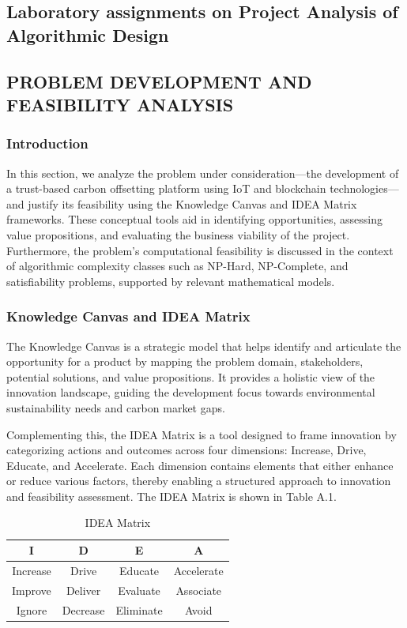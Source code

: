 \documentclass[oneside,a4paper,12pt]{book}
\begin{document}
\begin{appendices}

\chapter{Laboratory assignments on Project Analysis of Algorithmic Design}


\section{PROBLEM DEVELOPMENT AND FEASIBILITY ANALYSIS}

\subsection{Introduction}
In this section, we analyze the problem under consideration—the development of a trust-based carbon offsetting platform using IoT and blockchain technologies—and justify its feasibility using the Knowledge Canvas and IDEA Matrix frameworks. These conceptual tools aid in identifying opportunities, assessing value propositions, and evaluating the business viability of the project. Furthermore, the problem's computational feasibility is discussed in the context of algorithmic complexity classes such as NP-Hard, NP-Complete, and satisfiability problems, supported by relevant mathematical models.

\subsection{Knowledge Canvas and IDEA Matrix}
The Knowledge Canvas is a strategic model that helps identify and articulate the opportunity for a product by mapping the problem domain, stakeholders, potential solutions, and value propositions. It provides a holistic view of the innovation landscape, guiding the development focus towards environmental sustainability needs and carbon market gaps.

Complementing this, the IDEA Matrix is a tool designed to frame innovation by categorizing actions and outcomes across four dimensions: Increase, Drive, Educate, and Accelerate. Each dimension contains elements that either enhance or reduce various factors, thereby enabling a structured approach to innovation and feasibility assessment. The IDEA Matrix is shown in Table A.1.

\begin{table}[h]
\centering
\begin{tabular}{|c|c|c|c|}
\hline
\textbf{I} & \textbf{D} & \textbf{E} & \textbf{A} \\
\hline
Increase & Drive & Educate & Accelerate \\
\hline
Improve & Deliver & Evaluate & Associate \\
\hline
Ignore & Decrease & Eliminate & Avoid \\
\hline
\end{tabular}
\caption{IDEA Matrix}
\label{tab:idea_matrix}
\end{table}


\end{appendices}
\end{document}
